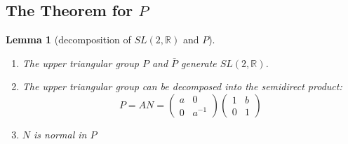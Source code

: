 \documentclass[
  12pt
]{article}
\theoremstyle{plain}
\newtheorem{lem}[thm]{Lemma}
\newcommand{\sltr}{\ensuremath{SL(2, \mathbb{R})}\xspace}
\begin{document}
  \hypertarget{theorem-for-p}{%
  \subsection{The Theorem for \texorpdfstring{$P$}{P}}\label{theorem-for-p}}

  \begin{lem}[decomposition of \sltr and $P$]
    \label{ref:lem:decomp}
    \begin{enumerate}
      \item The upper triangular group $P$ and $\bar{P}$ generate \sltr.
      \item The upper triangular group can be decomposed into the semidirect product:
        $$
        P = AN = \begin{pmatrix}a & 0 \\ 0 & a^{-1}\end{pmatrix} \begin{pmatrix}1 & b \\ 0 & 1\end{pmatrix}
        $$
      \item $N$ is normal in $P$
    \end{enumerate}
     
  \end{lem}
\end{document}
